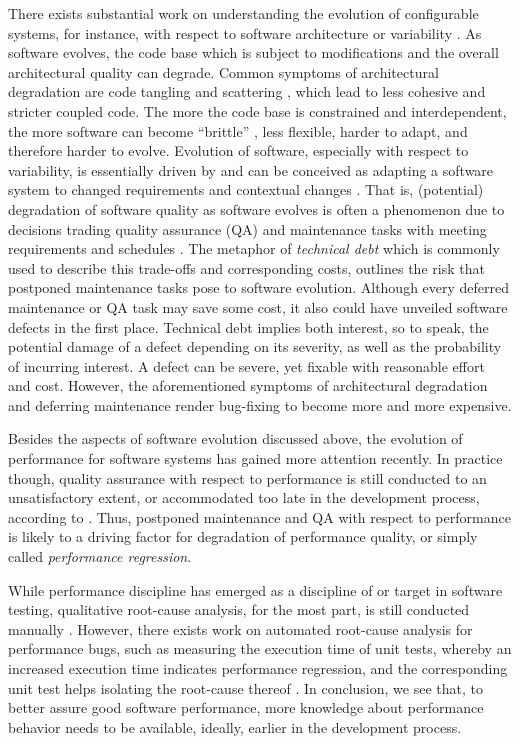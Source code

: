 There exists substantial work on understanding the evolution of configurable
systems, for instance, with respect to software architecture
\citep{zhang_variability_2013,passos_feature_2015} or variability
\citep{seidl_co-evolution_2012,peng_analyzing_2011,passos_towards_2012}. As
software evolves, the code base which is subject to modifications and the
overall architectural quality can degrade. Common symptoms of architectural
degradation are code tangling and scattering
\citep{zhang_variability_2013,passos_feature_2015}, which lead to less cohesive and stricter coupled code. 
The more the code base is constrained and interdependent, the more software can become ``brittle'' \citep{perry_software_1991}, less flexible, harder to adapt, and therefore harder to evolve.
Evolution of software, especially with respect to variability, is essentially
driven by and can be conceived as adapting a software system to changed
requirements and contextual changes \citep{peng_analyzing_2011}. That is,
(potential) degradation of software quality as software evolves is often a phenomenon due
to decisions trading quality assurance (QA) and maintenance tasks with meeting
requirements and schedules \citep{guo_tracking_2011}. The metaphor of
\emph{technical debt} \citep{guo_tracking_2011} which is commonly used to
describe this trade-offs and corresponding costs, outlines the risk that postponed maintenance tasks pose to
software evolution. Although every deferred maintenance or QA task may save
some cost, it also could have unveiled software defects
in the first place. Technical debt implies both interest, so to speak, the
potential damage of a defect depending on its severity, as well as the
probability of incurring interest. A defect can be severe, yet fixable with
reasonable effort and cost. However, the aforementioned symptoms of
architectural degradation and deferring maintenance render bug-fixing to become
more and more expensive.

Besides the aspects of software evolution discussed above, the evolution of
performance for software systems has gained more attention recently. In
practice though, quality assurance with respect to performance is still
conducted to an unsatisfactory extent, or accommodated too late in the
development process, according to \cite{molyneaux_art_2014}. Thus, postponed
maintenance and QA with respect to performance is likely to a driving factor for
degradation of performance quality, or simply called \emph{performance regression}.

While performance discipline has emerged as a discipline of or target
in software testing, qualitative root-cause analysis, for the most part, is
still conducted manually \citep{molyneaux_art_2014}. However, there exists work
on automated root-cause analysis for performance bugs, such as measuring the
execution time of unit tests, whereby an increased execution time indicates performance
regression, and the corresponding unit test helps isolating the root-cause
thereof \citep{heger_automated_2013,nguyen_industrial_2014}. In conclusion, we
see that, to better assure good software performance, more knowledge about performance behavior needs to be
available, ideally, earlier in the development process.

